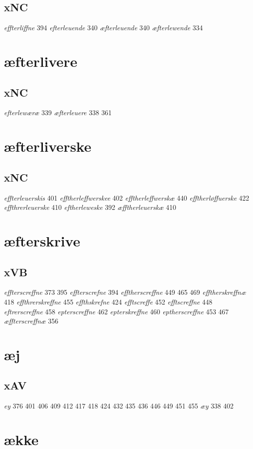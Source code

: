 \documentclass[a4paper,twocolumn]{article}
\begin{document}
\subsection{xNC}
\label{sec:org8ef320b}
\emph{effterliffne} 394 \emph{efterleuende} 340 \emph{æfterleuende} 340 \emph{æfterlewende} 334 
\section{æfterlivere}
\label{sec:orgd5cc4e5}
\subsection{xNC}
\label{sec:org99dfcad}
\emph{efterlewæræ} 339 \emph{æfterleuere} 338 361 
\section{æfterliverske}
\label{sec:org694578b}
\subsection{xNC}
\label{sec:orgad64680}
\emph{effterleuerskis} 401 \emph{efftherleffwerskee} 402 \emph{efftherleffwerskæ} 440 \emph{efftherløffuerske} 422 \emph{effthrerleuerske} 410 \emph{eftherleweske} 392 \emph{æfftherleuerskæ} 410 
\section{æfterskrive}
\label{sec:org7788a51}
\subsection{xVB}
\label{sec:orgfd2cacf}
\emph{effterscreffne} 373 395 \emph{effterscrefne} 394 \emph{efftherscreffne} 449 465 469 \emph{efftherskreffnæ} 418 \emph{effthrerskreffne} 455 \emph{effthskrefne} 424 \emph{efftscreffe} 452 \emph{efftscreffne} 448 \emph{eftrerscreffne} 458 \emph{epterscreffne} 462 \emph{epterskreffne} 460 \emph{eptherscreffne} 453 467 \emph{æffterscreffnæ} 356 
\section{æj}
\label{sec:org65b5c16}
\subsection{xAV}
\label{sec:orgcd03d8a}
\emph{ey} 376 401 406 409 412 417 418 424 432 435 436 446 449 451 455 \emph{æy} 338 402 
\section{ække}
\label{sec:orgd084826}
\end{document}
